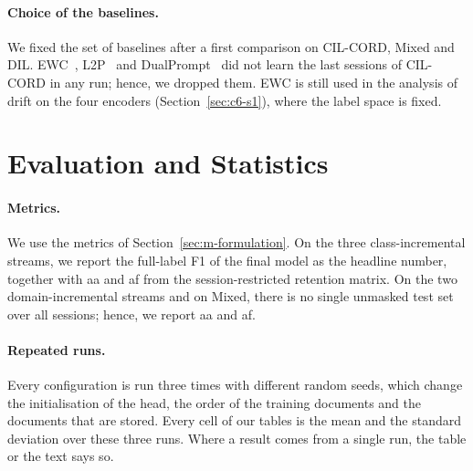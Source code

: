 \begin{table}[!htbp]
  \centering
  \caption[The baselines]{\textbf{The baselines}: family, what our re-implementation
  changes against the published method, and what it keeps across the sessions (memory on
  CIL-CORD).}
  \label{tab:baselines}
  \resizebox{\textwidth}{!}{}
\end{table}

\paragraph{Choice of the baselines.} We fixed the set of baselines after a first comparison
on CIL-CORD, Mixed and DIL. EWC~\citep{kirkpatrick2017ewc}, L2P~\citep{wang2022l2p} and
DualPrompt~\citep{wang2022dualprompt} did not learn the last sessions of CIL-CORD in any
run; hence, we dropped them. EWC is still used in
the analysis of drift on the four encoders (Section~\ref{sec:c6-s1}), where the label space
is fixed.

\section{Evaluation and Statistics}
\label{sec:e-eval}

\paragraph{Metrics.} We use the metrics of Section~\ref{sec:m-formulation}. On the three
class-incremental streams, we report the full-label F1 of the final model as the headline
number, together with \gls{aa} and \gls{af} from the session-restricted retention matrix.
On the two domain-incremental streams and on Mixed, there is no single unmasked test set
over all sessions; hence, we report \gls{aa} and \gls{af}.

\paragraph{Repeated runs.} Every configuration is run three times with different random
seeds, which change the initialisation of the head, the order of the training documents and
the documents that are stored. Every cell of our tables is the mean and the standard
deviation over these three runs. Where a result comes from a single run, the table or the
text says so.

